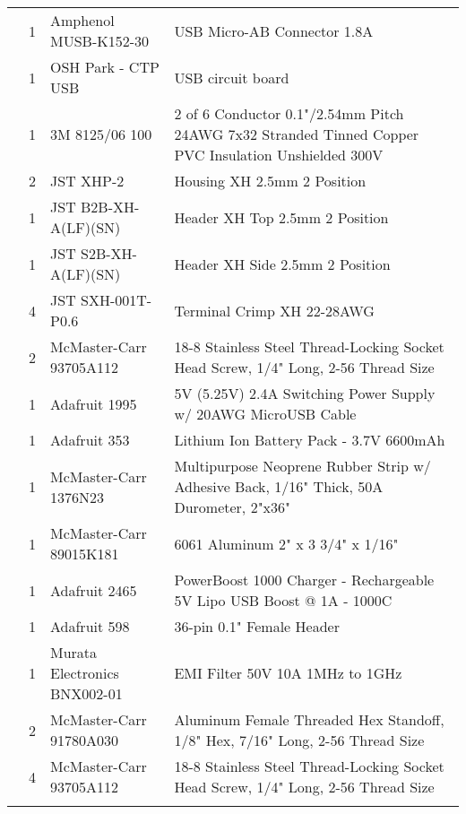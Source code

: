 \begin{longtabu}{X[3,c,m] X[1,c,m] X[3,c,m] X[5,l,m]}
   & 1 & Amphenol MUSB-K152-30 & USB Micro-AB Connector 1.8A \\
  & 1 & OSH Park - CTP USB & USB circuit board \\
  & 1 & 3M 8125/06 100 & 2 of 6 Conductor 0.1"/2.54mm Pitch 24AWG 7x32 Stranded Tinned Copper PVC Insulation Unshielded 300V \\
  & 2 & JST XHP-2 & Housing XH 2.5mm 2 Position \\
  & 1 & JST B2B-XH-A(LF)(SN) & Header XH Top 2.5mm 2 Position \\
  & 1 & JST S2B-XH-A(LF)(SN) & Header XH Side 2.5mm 2 Position \\
  & 4 & JST SXH-001T-P0.6 & Terminal Crimp XH 22-28AWG \\
  & 2 & McMaster-Carr 93705A112 & 18-8 Stainless Steel Thread-Locking Socket Head Screw, 1/4" Long, 2-56 Thread Size \\ \mrule

   & 1 & Adafruit 1995 & 5V (5.25V) 2.4A Switching Power Supply w/ 20AWG MicroUSB Cable \\ \mrule

   & 1 & Adafruit 353 & Lithium Ion Battery Pack - 3.7V 6600mAh \\
  & 1 & McMaster-Carr 1376N23 & Multipurpose Neoprene Rubber Strip w/ Adhesive Back, 1/16" Thick, 50A Durometer, 2"x36" \\
  & 1 & McMaster-Carr 89015K181 & 6061 Aluminum 2" x 3 3/4" x 1/16" \\ \mrule

   & 1 & Adafruit 2465 & PowerBoost 1000 Charger - Rechargeable 5V Lipo USB Boost @ 1A - 1000C \\
  & 1 & Adafruit 598 & 36-pin 0.1" Female Header \\
  & 1 & Murata Electronics BNX002-01 & EMI Filter 50V 10A 1MHz to 1GHz \\
  & 2 & McMaster-Carr 91780A030 & Aluminum Female Threaded Hex Standoff, 1/8" Hex, 7/16" Long, 2-56 Thread Size \\
  & 4 & McMaster-Carr 93705A112 & 18-8 Stainless Steel Thread-Locking Socket Head Screw, 1/4" Long, 2-56 Thread Size \\ \mrule


\end{longtabu}
